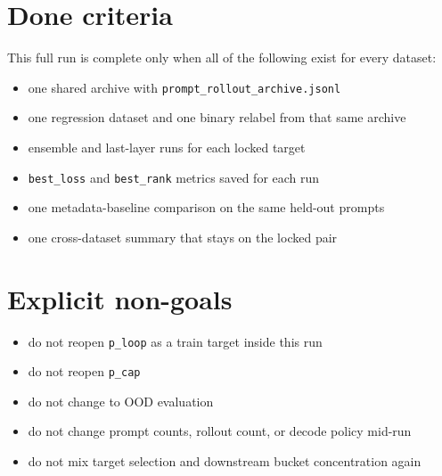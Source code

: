 \documentclass[11pt]{article}
\begin{document}
\section*{Done criteria}

This full run is complete only when all of the following exist for every dataset:
\begin{itemize}[leftmargin=1.5em]
\item one shared archive with \texttt{prompt\_rollout\_archive.jsonl}
\item one regression dataset and one binary relabel from that same archive
\item ensemble and last-layer runs for each locked target
\item \texttt{best\_loss} and \texttt{best\_rank} metrics saved for each run
\item one metadata-baseline comparison on the same held-out prompts
\item one cross-dataset summary that stays on the locked pair
\end{itemize}

\section*{Explicit non-goals}

\begin{itemize}[leftmargin=1.5em]
\item do not reopen \texttt{p\_loop} as a train target inside this run
\item do not reopen \texttt{p\_cap}
\item do not change to OOD evaluation
\item do not change prompt counts, rollout count, or decode policy mid-run
\item do not mix target selection and downstream bucket concentration again
\end{itemize}
\end{document}
